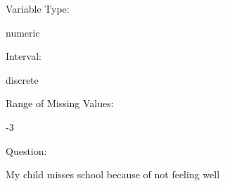 \documentclass[
]{article}
\begin{document}
\begin{minipage}[t]{0.3\linewidth}

Variable Type:

\end{minipage}%
\begin{minipage}[t]{0.7\linewidth}

numeric

\end{minipage}

\begin{minipage}[t]{0.3\linewidth}

Interval:

\end{minipage}%
\begin{minipage}[t]{0.7\linewidth}

discrete

\end{minipage}

\begin{minipage}[t]{0.3\linewidth}

Range of Missing Values:

\end{minipage}%
\begin{minipage}[t]{0.7\linewidth}

-3

\end{minipage}

\begin{minipage}[t]{0.3\linewidth}

Question:

\end{minipage}%
\begin{minipage}[t]{0.7\linewidth}

My child misses school because of not feeling well

\end{minipage}
\end{document}
